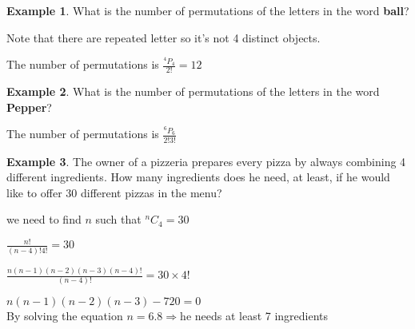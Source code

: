 \documentclass[12pt]{article}
\theoremstyle{definition}
\newtheorem{exmp}{Example}[section]
\newcommand*{\Perm}[2]{{}^{#1}\!P_{#2}}%
\newcommand*{\Comb}[2]{{}^{#1}C_{#2}}%
\begin{document}
\begin{exmp}
    What is the number of permutations of the letters in the word \textbf{ball}?
    \begin{center}
        Note that there are repeated letter so it's not 4 distinct objects.
    \end{center}    
    \begin{center}
        The number of permutations is $\displaystyle  \frac{\Perm{4}{4}}{2!} = 12$
    \end{center}    
\end{exmp}    

\begin{exmp}
    What is the number of permutations of the letters in the word \textbf{Pepper}?

    \begin{center}
        The number of permutations is $\displaystyle  \frac{\Perm{6}{6}}{2!3!}$
    \end{center}   
\end{exmp}    

\begin{exmp}
    The owner of a pizzeria prepares every pizza by always combining 4 different
    ingredients. How many ingredients does he need, at least, if he would like to
    offer 30 different pizzas in the menu?
    \begin{center}
        we need to find $n$ such that $\Comb{n}{4} = 30$ 
    \end{center}    
    \begin{center}
        $\displaystyle \frac{n!}{(n-4)!4!} = 30$ \\
    \end{center}    
    \begin{center}
        $\displaystyle \frac{n(n-1)(n-2)(n-3)(n-4)!}{(n-4)!} = 30 \times 4!$
    \end{center}    
    \begin{center}
        $\displaystyle n(n-1)(n-2)(n-3) - 720 = 0$ \\

        By solving the equation $n = 6.8 \Rightarrow $he needs at least 7 ingredients
    \end{center}    

\end{exmp}    
\end{document}
